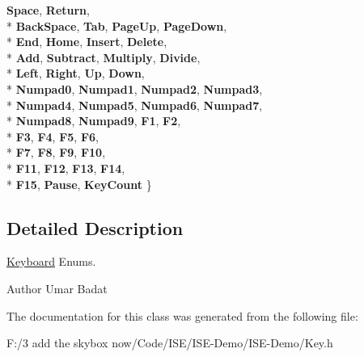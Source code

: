 \begin{DoxyCompactItemize}
{\bfseries Space}, 
{\bfseries Return}, 
\\*
{\bfseries Back\-Space}, 
{\bfseries Tab}, 
{\bfseries Page\-Up}, 
{\bfseries Page\-Down}, 
\\*
{\bfseries End}, 
{\bfseries Home}, 
{\bfseries Insert}, 
{\bfseries Delete}, 
\\*
{\bfseries Add}, 
{\bfseries Subtract}, 
{\bfseries Multiply}, 
{\bfseries Divide}, 
\\*
{\bfseries Left}, 
{\bfseries Right}, 
{\bfseries Up}, 
{\bfseries Down}, 
\\*
{\bfseries Numpad0}, 
{\bfseries Numpad1}, 
{\bfseries Numpad2}, 
{\bfseries Numpad3}, 
\\*
{\bfseries Numpad4}, 
{\bfseries Numpad5}, 
{\bfseries Numpad6}, 
{\bfseries Numpad7}, 
\\*
{\bfseries Numpad8}, 
{\bfseries Numpad9}, 
{\bfseries F1}, 
{\bfseries F2}, 
\\*
{\bfseries F3}, 
{\bfseries F4}, 
{\bfseries F5}, 
{\bfseries F6}, 
\\*
{\bfseries F7}, 
{\bfseries F8}, 
{\bfseries F9}, 
{\bfseries F10}, 
\\*
{\bfseries F11}, 
{\bfseries F12}, 
{\bfseries F13}, 
{\bfseries F14}, 
\\*
{\bfseries F15}, 
{\bfseries Pause}, 
{\bfseries Key\-Count}
 \}
\end{DoxyCompactItemize}


\subsection{Detailed Description}
\hyperlink{class_keyboard}{Keyboard} Enums. 

\begin{DoxyAuthor}{Author}
Umar Badat 
\end{DoxyAuthor}


The documentation for this class was generated from the following file\-:\begin{DoxyCompactItemize}
\item 
F\-:/3 add the skybox now/\-Code/\-I\-S\-E/\-I\-S\-E-\/\-Demo/\-I\-S\-E-\/\-Demo/Key.\-h\end{DoxyCompactItemize}
